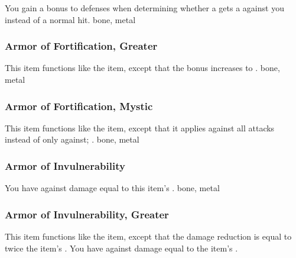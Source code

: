 You gain a  bonus to defenses when determining whether a  gets a  against you instead of a normal hit.
 
 bone, metal
\lowercase{\hypertarget{item:Armor of Fortification, Greater}{}}\label{item:Armor of Fortification, Greater}
\hypertarget{item:Armor of Fortification, Greater}{\subsubsection{Armor of Fortification, Greater\hfill{}}}
This item functions like the  item, except that the bonus increases to .
 
 bone, metal
\lowercase{\hypertarget{item:Armor of Fortification, Mystic}{}}\label{item:Armor of Fortification, Mystic}
\hypertarget{item:Armor of Fortification, Mystic}{\subsubsection{Armor of Fortification, Mystic\hfill{}}}
This item functions like the  item, except that it applies against all attacks instead of only against; .
 
 bone, metal
\lowercase{\hypertarget{item:Armor of Invulnerability}{}}\label{item:Armor of Invulnerability}
\hypertarget{item:Armor of Invulnerability}{\subsubsection{Armor of Invulnerability\hfill{}}}
You have  against  damage equal to this item's .
 
 bone, metal
\lowercase{\hypertarget{item:Armor of Invulnerability, Greater}{}}\label{item:Armor of Invulnerability, Greater}
\hypertarget{item:Armor of Invulnerability, Greater}{\subsubsection{Armor of Invulnerability, Greater\hfill{}}}
This item functions like the  item, except that the damage reduction is equal to twice the item's .
You have  against  damage equal to the item's .
 

